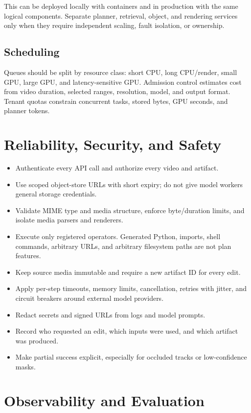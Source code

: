 \documentclass[11pt]{article}
\begin{document}
This can be deployed locally with containers and in production with the same
logical components. Separate planner, retrieval, object, and rendering services
only when they require independent scaling, fault isolation, or ownership.

\subsection{Scheduling}

Queues should be split by resource class: short CPU, long CPU/render, small GPU,
large GPU, and latency-sensitive GPU. Admission control estimates cost from
video duration, selected ranges, resolution, model, and output format. Tenant
quotas constrain concurrent tasks, stored bytes, GPU seconds, and planner tokens.

\section{Reliability, Security, and Safety}

\begin{itemize}
  \item Authenticate every API call and authorize every video and artifact.
  \item Use scoped object-store URLs with short expiry; do not give model workers
  general storage credentials.
  \item Validate MIME type and media structure, enforce byte/duration limits, and
  isolate media parsers and renderers.
  \item Execute only registered operators. Generated Python, imports, shell
  commands, arbitrary URLs, and arbitrary filesystem paths are not plan features.
  \item Keep source media immutable and require a new artifact ID for every edit.
  \item Apply per-step timeouts, memory limits, cancellation, retries with jitter,
  and circuit breakers around external model providers.
  \item Redact secrets and signed URLs from logs and model prompts.
  \item Record who requested an edit, which inputs were used, and which artifact
  was produced.
  \item Make partial success explicit, especially for occluded tracks or
  low-confidence masks.
\end{itemize}

\section{Observability and Evaluation}
\end{document}
